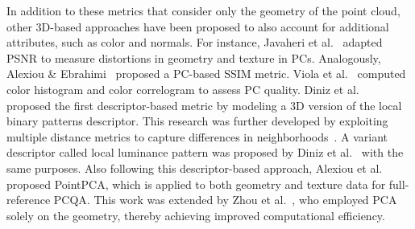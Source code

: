 \documentclass[final,3p,times,twocolumn]{elsarticle}
\begin{document}
In addition to these metrics that consider only the geometry of the point cloud, other \gls{3D}-based approaches have been proposed to also account for additional attributes, such as color and normals. For instance, Javaheri et al.~\cite{javaheri2020improving} adapted \gls{PSNR} to measure distortions in geometry and texture in \glspl{PC}. Analogously, Alexiou \& Ebrahimi~\cite{alexiou2020towards} proposed a \gls{PC}-based \gls{SSIM} metric. Viola et al.~\cite{viola2020color} computed color histogram and color correlogram to assess \gls{PC} quality. Diniz et al.~\cite{Diniz2020Towards} proposed the first descriptor-based metric by modeling a \gls{3D} version of the local binary patterns descriptor. This research was further developed by exploiting multiple distance metrics to capture differences in neighborhoods~\cite{diniz2020multi}. A variant descriptor called local luminance pattern was proposed by Diniz et al.~\cite{diniz2020localluminance, diniz2021novel} with the same purposes. Also following this descriptor-based approach, Alexiou et al.~\cite{alexiou2024pointpca} proposed PointPCA, which is applied to both geometry and texture data for full-reference \gls{PCQA}. This work was extended by Zhou et al.~\cite{zhou2023pointpca+, zhou2025pointpca+}, who employed \gls{PCA} solely on the geometry, thereby achieving improved computational efficiency.
\end{document}
